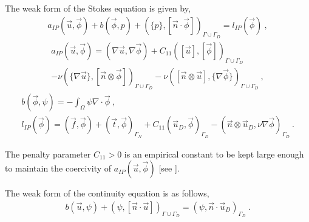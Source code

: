 \documentclass[graybox]{svmult}
\begin{document}
The weak form of the Stokes equation is given by,
\begin{gather}\label{stokes_weak_ch3}
a_{IP}(\overrightarrow{u},\overrightarrow{\phi}) + b(\overrightarrow{\phi},p) + \left( \lbrace p \rbrace,[\overrightarrow{n} \cdot \overrightarrow{\phi}] \right)_{\Gamma \cup \Gamma_D} = l_{IP}(\overrightarrow{\phi}) \ ,
\end{gather}
\begin{equation}
\begin{split}
a_{IP}(\overrightarrow{u},\overrightarrow{\phi}) = \left( \nabla \overrightarrow{u}, \nabla \overrightarrow{\phi} \right) + C_{11} \left( [\overrightarrow{u}],[\overrightarrow{\phi}] \right)_{\Gamma \cup \Gamma_D} \\ - \nu \left( \lbrace \nabla \overrightarrow{u}\rbrace ,[\overrightarrow{n} \otimes \overrightarrow{\phi}] \right)_{\Gamma \cup \Gamma_D} - \nu \left( [\overrightarrow{n} \otimes \overrightarrow{u}], \lbrace \nabla \overrightarrow{\phi} \rbrace \right)_{\Gamma \cup \Gamma_D} \ ,
\end{split}
\end{equation}
\begin{gather}
b(\overrightarrow{\phi},\psi) = -\int_{\Omega} \psi \nabla \cdot \overrightarrow{\phi} \ , \\
l_{IP}(\overrightarrow{\phi}) = \left( \overrightarrow{f},\overrightarrow{\phi} \right) + \left( \overrightarrow{t},\overrightarrow{\phi} \right)_{\Gamma_N} + C_{11} \left(\overrightarrow{u}_D,\overrightarrow{\phi}\right)_{\Gamma_D} - \left( \overrightarrow{n} \otimes \overrightarrow{u}_D, \nu \nabla \overrightarrow{\phi} \right)_{\Gamma_D} \ .
\end{gather}

The penalty parameter $C_{11}>0$ is an empirical constant to be kept large enough to maintain the coercivity of $a_{IP}(\overrightarrow{u},\overrightarrow{\phi})$ [see \cite{jump_mean_operator}].

The weak form of the continuity equation is as follows,
\begin{equation}\label{contiuity_weak_ch3}
\begin{split}
b(\overrightarrow{u},\psi) + ({\psi},[\overrightarrow{n} \cdot \overrightarrow{u}])_{\Gamma \cup \Gamma_D} = (\psi,\overrightarrow{n} \cdot \overrightarrow{u}_D)_{\Gamma_D} \ .
\end{split}
\end{equation}
\end{document}
